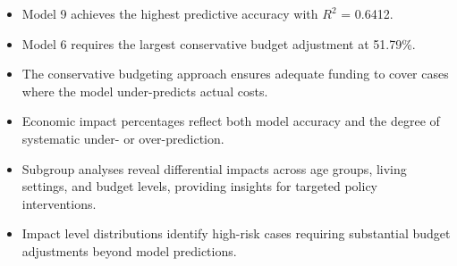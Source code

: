 \begin{itemize}
\item Model 9 achieves the highest predictive accuracy with $R^2$ = 0.6412.
\item Model 6 requires the largest conservative budget adjustment at 51.79\%.
\item The conservative budgeting approach ensures adequate funding to cover cases where the model under-predicts actual costs.
\item Economic impact percentages reflect both model accuracy and the degree of systematic under- or over-prediction.
\item Subgroup analyses reveal differential impacts across age groups, living settings, and budget levels, providing insights for targeted policy interventions.
\item Impact level distributions identify high-risk cases requiring substantial budget adjustments beyond model predictions.
\end{itemize}

